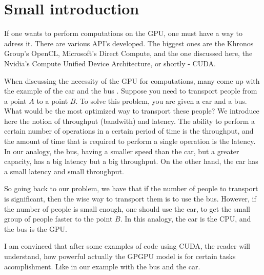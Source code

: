 \section*{Small introduction}
If one wants to perform computations on the GPU, one must have a way to adress it. There are various
API's developed. The biggest ones are the Khronos Group's OpenCL, Microsoft's Direct Compute, and the one 
discussed here, the Nvidia's Compute Unified Device Architecture, or shortly - CUDA.


When discussing the necessity of the GPU for computations, many come up with the example of the car and the bus \cite{habr_car_vs_bus}. 
Suppose you need to transport people from a point $A$ to a point $B$. To solve this problem, you are 
given a car and a bus. What would be the most optimized way to transport these people? We introduce here
the notion of throughput (bandwith) and latency. The ability to perform a certain number of operations in a certain period of 
time is the throughput, and the amount of time that is required to perform a single operation is the latency.
In our analogy, the bus, having a smaller speed than the car, but a greater capacity, has a big latency but 
a big throughput. On the other hand, the car has a small latency and small throughput.


So going back to our problem, we have that if the number of people to transport is significant, 
then the wise way to transport them is to use the bus. However, if the number of people is small enough, 
one should use the car, to get the small group of people faster to the point $B$. 
In this analogy, the car is the CPU, and the bus is the GPU.

I am convinced that after some examples of code using CUDA, the reader will understand, how powerful
actually the GPGPU model is for certain tasks acomplishment. Like in our example with the bus and the car.

